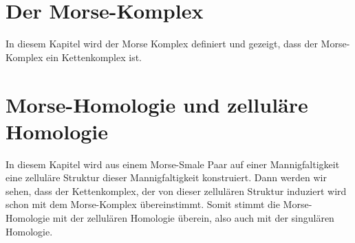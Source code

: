 \documentclass[a4paper,11pt,twoside]{scrreport}
\begin{document}
\chapter{Der Morse-Komplex}
In diesem Kapitel wird der Morse Komplex definiert und gezeigt, dass der 
Morse-Komplex ein Kettenkomplex ist.




\chapter{Morse-Homologie und zelluläre Homologie}

In diesem Kapitel wird aus einem Morse-Smale Paar auf einer Mannigfaltigkeit
eine zelluläre Struktur dieser Mannigfaltigkeit konstruiert. Dann werden wir 
sehen, dass der Kettenkomplex, der von dieser zellulären Struktur induziert wird schon mit
dem Morse-Komplex übereinstimmt. Somit stimmt die Morse-Homologie mit der 
zellulären Homologie überein, also auch mit der singulären Homologie.






% 

\printbibliography

\eject
\end{document}
